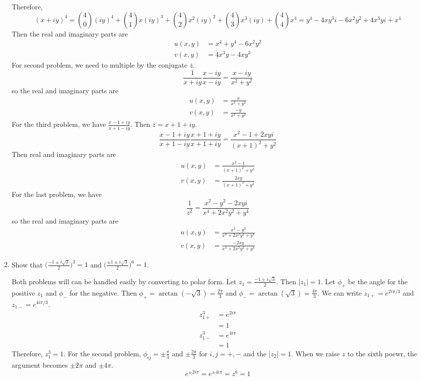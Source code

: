 \begin{enumerate}
  Therefore,
  \[
  (x + iy)^4 = \binom{4}{0}(iy)^4 + \binom{4}{1}x(iy)^3 +
  \binom{4}{2}x^2(iy)^2 + \binom{4}{3}x^3(iy) + \binom{4}{4}x^4 =
  y^4 - 4xy^3i - 6x^2y^2 + 4x^3yi + x^4
  \]
  Then the real and imaginary parts are
  \begin{align*}
    u(x, y) & = x^4 + y^4 - 6x^2y^2\\
    v(x, y) & = 4x^3y - 4xy^3
  \end{align*}
  For second problem, we need to multiple by the conjugate \(\bar{z}\).
  \[
  \frac{1}{x + iy}\frac{x - iy}{x - iy} = \frac{x - iy}{x^2 + y^2}
  \]
  so the real and imaginary parts are
  \begin{align*}
    u(x, y) & = \frac{x}{x^2 + y^2}\\
    v(x, y) & = \frac{-y}{x^2 + y^2}
  \end{align*}
  For the third problem, we have \(\frac{x - 1 + iy}{x + 1 - iy}\).
  Then \(\bar{z} = x + 1 + iy\).
  \[
  \frac{x - 1 + iy}{x + 1 - iy}\frac{x + 1 + iy}{x + 1 + iy} =
  \frac{x^2 - 1 + 2xyi}{(x + 1)^2 + y^2}
  \]
  Then real and imaginary parts are
  \begin{align*}
    u(x, y) & = \frac{x^2 - 1}{(x + 1)^2 + y^2}\\
    v(x, y) & = \frac{2xy}{(x + 1)^2 + y^2}
  \end{align*}
  For the last problem, we have
  \[
  \frac{1}{z^2} = \frac{x^2 - y^2 - 2xyi}{x^4 + 2x^2y^2 + y^4}
  \]
  so the real and imaginary parts are
  \begin{align*}
    u(x, y) & = \frac{x^2 - y^2}{x^4 + 2x^2y^2 + y^4}\\
    v(x, y) & = \frac{-2xy}{x^4 + 2x^2y^2 + y^4}
  \end{align*}
\item
  Show that \(\bigl(\frac{-1\pm i\sqrt{3}}{2}\bigr)^3 = 1\) and
  \(\bigl(\frac{\pm 1\pm i\sqrt{3}}{2}\bigr)^6 = 1\).
  \par\smallskip
  Both problems will can be handled easily by converting to polar form.
  Let \(z_1 = \frac{-1\pm i\sqrt{3}}{2}\).
  Then \(\lvert z_1\rvert = 1\).
  Let \(\phi_+\) be the angle for the positive \(z_1\) and \(\phi_-\) for the
  negative.
  Then \(\phi_+ = \arctan(-\sqrt{3}) = \frac{2\pi}{3}\) and
  \(\phi_- = \arctan(\sqrt{3}) = \frac{4\pi}{3}\).
  We can write \(z_{1+} = e^{2i\pi/3}\) and \(z_{1-} = e^{4i\pi/3}\).
  \begin{align*}
    z_{1+}^3 & = e^{2i\pi}\\
             & = 1\\
    z_{1-}^3 & = e^{4i\pi}\\
             & = 1
  \end{align*}
  Therefore, \(z_1^3 = 1\).
  For the second problem, \(\phi_{ij} = \pm\frac{\pi}{3}\) and
  \(\pm\frac{2\pi}{3}\) for \(i, j = +, -\) and the \(\lvert z_2\rvert = 1\).
  When we raise \(z\) to the sixth poewr, the argument becomes \(\pm 2\pi\) and
  \(\pm 4\pi\).
  \[
  e^{\pm 2i\pi} = e^{\pm 4i\pi} = z^6 = 1
  \]
\end{enumerate}

